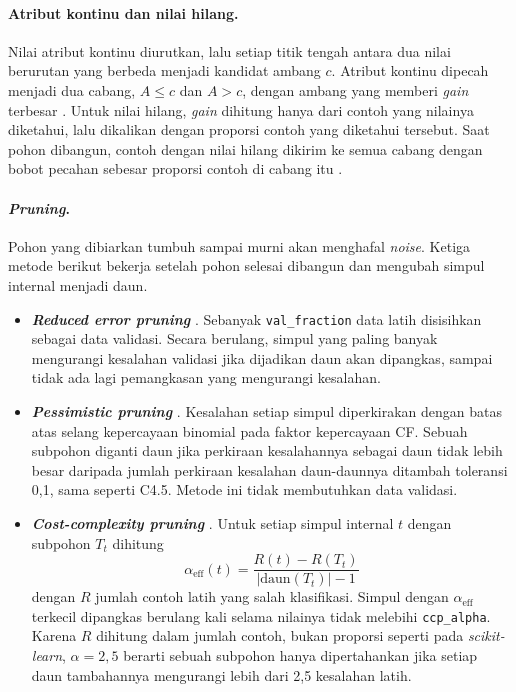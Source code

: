 \paragraph{Atribut kontinu dan nilai hilang.} Nilai atribut kontinu diurutkan, lalu setiap titik
tengah antara dua nilai berurutan yang berbeda menjadi kandidat ambang $c$. Atribut kontinu dipecah
menjadi dua cabang, $A \le c$ dan $A > c$, dengan ambang yang memberi \textit{gain} terbesar
\cite{slide-dtl-issues}. Untuk nilai hilang, \textit{gain} dihitung hanya dari contoh yang nilainya
diketahui, lalu dikalikan dengan proporsi contoh yang diketahui tersebut. Saat pohon dibangun, contoh
dengan nilai hilang dikirim ke semua cabang dengan bobot pecahan sebesar proporsi contoh di cabang itu
\cite{slide-dtl-issues,quinlan1993c45}.

\paragraph{\textit{Pruning}.} Pohon yang dibiarkan tumbuh sampai murni akan menghafal
\textit{noise}. Ketiga metode berikut bekerja setelah pohon selesai dibangun dan mengubah simpul
internal menjadi daun.
\begin{itemize}
	\item \textbf{\textit{Reduced error pruning}} \cite{slide-dtl-issues}. Sebanyak
	\texttt{val\_fraction} data latih disisihkan sebagai data validasi. Secara berulang, simpul yang
	paling banyak mengurangi kesalahan validasi jika dijadikan daun akan dipangkas, sampai tidak ada
	lagi pemangkasan yang mengurangi kesalahan.
	\item \textbf{\textit{Pessimistic pruning}} \cite{quinlan1993c45}. Kesalahan setiap simpul
	diperkirakan dengan batas atas selang kepercayaan binomial pada faktor kepercayaan CF. Sebuah
	subpohon diganti daun jika perkiraan kesalahannya sebagai daun tidak lebih besar daripada jumlah
	perkiraan kesalahan daun-daunnya ditambah toleransi 0,1, sama seperti C4.5. Metode ini tidak
	membutuhkan data validasi.
	\item \textbf{\textit{Cost-complexity pruning}} \cite{breiman1984cart}. Untuk setiap simpul
	internal $t$ dengan subpohon $T_t$ dihitung
	\begin{equation}
		\alpha_{\text{eff}}(t) = \frac{R(t) - R(T_t)}{|\text{daun}(T_t)| - 1}
		\label{eq:dtl-ccp}
	\end{equation}
	dengan $R$ jumlah contoh latih yang salah klasifikasi. Simpul dengan $\alpha_{\text{eff}}$
	terkecil dipangkas berulang kali selama nilainya tidak melebihi \texttt{ccp\_alpha}. Karena $R$
	dihitung dalam jumlah contoh, bukan proporsi seperti pada \textit{scikit-learn}, $\alpha = 2{,}5$
	berarti sebuah subpohon hanya dipertahankan jika setiap daun tambahannya mengurangi lebih dari 2,5
	kesalahan latih.
\end{itemize}

